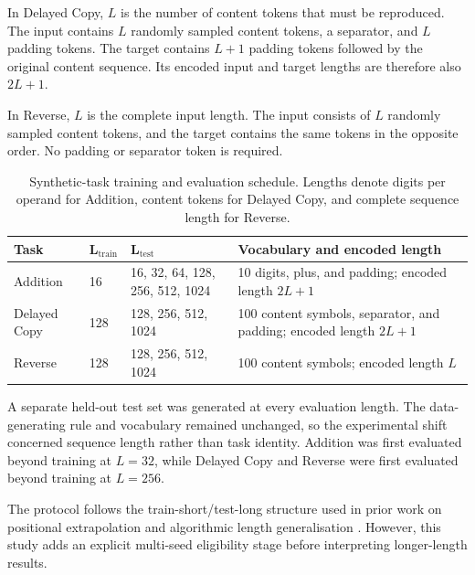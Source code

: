 \documentclass[
    author={Aanchala Ravindra Bhongade},
    supervisor={Dr. Fernando Moreno-Pino},
    degree={MSc},
    title={Length Generalisation in Transformer-Based Sequence Models: Failure Taxonomy and Mitigation Strategies},
    subtitle={},
    type={},
    year={2026}
]{dissertation}
\begin{document}
In Delayed Copy, \(L\) is the number of content tokens that must be
reproduced. The input contains \(L\) randomly sampled content tokens, a separator, and \(L\) padding tokens. The target contains \(L+1\) padding tokens followed by the original content sequence. Its encoded input and target lengths are therefore also \(2L+1\).

In Reverse, \(L\) is the complete input length. The input consists of \(L\) randomly sampled content tokens, and the target contains the same tokens in the opposite order. No padding or separator token is required.

\begin{table}[tbp]
\centering
\small
\renewcommand{\arraystretch}{1.15}
\begin{tabular}{
    p{}
    p{}
    p{}
    p{}
}
\hline
\textbf{Task} &
\(\boldsymbol{L_{\mathrm{train}}}\) &
\(\boldsymbol{L_{\mathrm{test}}}\) &
\textbf{Vocabulary and encoded length} \\
\hline

Addition &
16 &
16, 32, 64, 128, 256, 512, 1024 &
10 digits, plus, and padding; encoded length \(2L+1\) \\

Delayed Copy &
128 &
128, 256, 512, 1024 &
100 content symbols, separator, and padding; encoded length \(2L+1\) \\

Reverse &
128 &
128, 256, 512, 1024 &
100 content symbols; encoded length \(L\) \\
\hline
\end{tabular}
\caption{Synthetic-task training and evaluation schedule. Lengths denote digits per operand for Addition, content tokens for Delayed Copy, and complete sequence length for Reverse.}
\label{tab:train-test-lengths}
\end{table}

A separate held-out test set was generated at every evaluation length. The data-generating rule and vocabulary remained unchanged, so the experimental shift concerned sequence length rather than task identity. Addition was first evaluated beyond training at \(L=32\), while Delayed Copy and Reverse were first evaluated beyond training at \(L=256\).

The protocol follows the train-short/test-long structure used in prior work on positional extrapolation and algorithmic length generalisation \cite{press2022train,kazemnejad2023impact,zhou2024algorithms, varis2021lengthdomain}. However, this study adds an explicit multi-seed eligibility stage before interpreting longer-length results.
\end{document}
